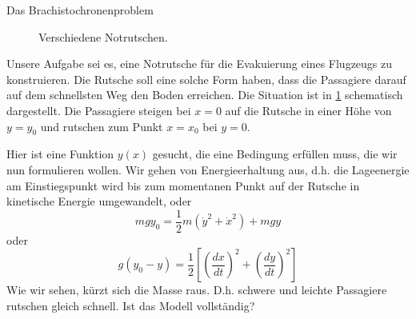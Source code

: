\begin{example}{Das Brachistochronenproblem}
  \begin{figure}
  \centering
   \caption{Verschiedene Notrutschen.}
  \label{fig:Rutsche}
 \end{figure}
  Unsere Aufgabe sei es, eine Notrutsche für die Evakuierung eines Flugzeugs zu
  konstruieren. Die Rutsche soll eine solche Form haben, dass die Passagiere
  darauf auf dem schnellsten Weg den Boden erreichen.  Die Situation ist in
  \ref{fig:Rutsche} schematisch dargestellt. Die Passagiere steigen bei $x=0$
  auf die Rutsche in einer Höhe von $y=y_0$ und rutschen zum Punkt $x=x_0$ bei
  $y=0$.

  Hier ist eine Funktion $y(x)$ gesucht, die eine Bedingung erfüllen muss, die
  wir nun formulieren wollen. Wir gehen von Energieerhaltung aus, d.h. die
  Lageenergie am Einstiegspunkt wird bis zum momentanen Punkt auf der Rutsche
  in kinetische Energie umgewandelt, oder 
  \[ mgy_0=\frac{1}{2}m(\dot{y}^2+\dot{x}^2)+mgy \]
  oder
  \begin{equation}
  g(y_0-y)=\frac{1}{2}\left[\left(\frac{dx}{dt}\right)^2
    +\left(\frac{dy}{dt}\right)^2\right]
    \label{eq:Rutschenergie}
  \end{equation}
  Wie wir sehen, kürzt sich die Masse raus. D.h. schwere und leichte Passagiere
 rutschen gleich schnell. Ist das Modell vollständig?
 

\end{example}
